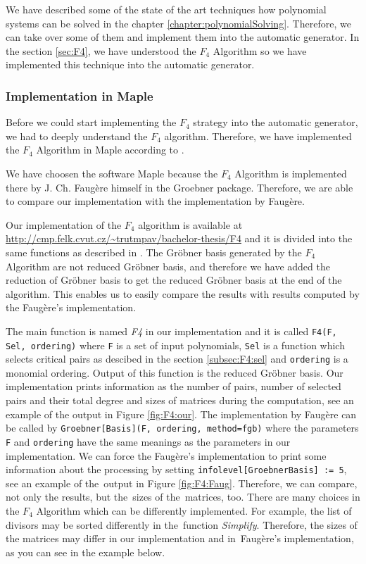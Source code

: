 We have described some of the state of the art techniques how polynomial systems can be solved in the chapter \ref{chapter:polynomialSolving}. Therefore, we can take over some of them and implement them into the automatic generator. In the section \ref{sec:F4}, we have understood the $F_4$ Algorithm \cite{F4} so we have implemented this technique into the automatic generator.

\subsubsection{Implementation in Maple}
Before we could start implementing the $F_4$ strategy into the automatic generator, we had to deeply understand the $F_4$ algorithm. Therefore, we have implemented the $F_4$ Algorithm in Maple according to \cite{F4}. 

We have choosen the software Maple because the $F_4$ Algorithm is implemented there by J. Ch. Faug\`ere himself in the Groebner package. Therefore, we are able to compare our implementation with the implementation by Faug\`ere.

Our implementation of the $F_4$ algorithm is available at \url{http://cmp.felk.cvut.cz/~trutmpav/bachelor-thesis/F4} and it is divided into the same functions as described in \cite{F4}. The Gr\"obner basis generated by the $F_4$ Algorithm are not reduced Gr\"obner basis, and therefore we have added the reduction of Gr\"obner basis to get the reduced Gr\"obner basis at the end of the algorithm. This enables us to easily compare the results with results computed by the Faug\`ere's implementation.

The main function is named \textit{F4} in our implementation and it is called \texttt{F4(F, Sel, ordering)} where \texttt{F} is a set of input polynomials, \texttt{Sel} is a function which selects critical pairs as descibed in the section \ref{subsec:F4:sel} and \texttt{ordering} is a monomial ordering. Output of this function is the reduced Gr\"obner basis. Our implementation prints information as the number of pairs, number of selected pairs and their total degree and sizes of matrices during the computation, see an example of the output in Figure \ref{fig:F4:our}. The implementation by Faug\`ere can be called by \texttt{Groebner[Basis](F, ordering, method=fgb)} where the parameters \texttt{F} and \texttt{ordering} have the same meanings as the parameters in our implementation. We can force the Faug\`ere's implementation to print some information about the processing by setting \texttt{infolevel[GroebnerBasis] := 5}, see an example of the~output in Figure \ref{fig:F4:Faug}. Therefore, we can compare, not only the results, but the~sizes of the~matrices, too. There are many choices in the $F_4$ Algorithm which can be differently implemented. For example, the list of divisors may be sorted differently in the~function \textit{Simplify}. Therefore, the sizes of the matrices may differ in our implementation and in~Faug\`ere's implementation, as you can see in the example below.

